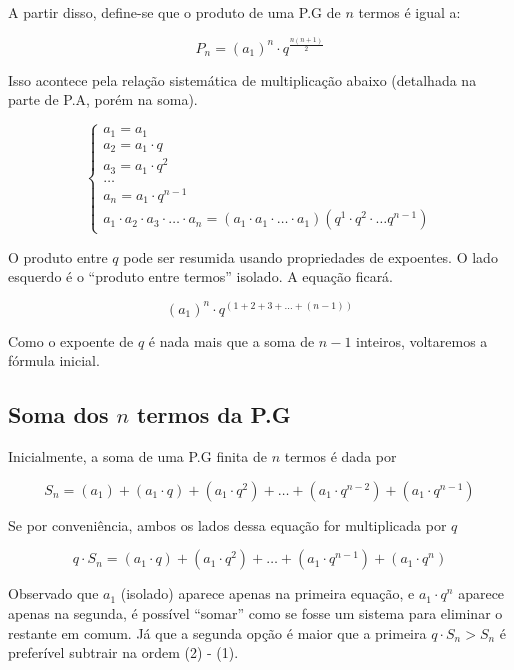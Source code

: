 A partir disso, define-se que o produto de uma P.G de $n$ termos é igual a:

\begin{tcolorbox}[colback=LightYellow]
\[P_{n} = (a_{1})^{n} \cdot q^{\frac{n(n + 1)}{2}}\]
\end{tcolorbox}

Isso acontece pela relação sistemática de multiplicação abaixo (detalhada na parte de P.A, porém na soma).

\begin{tcolorbox}[colback=LightYellow]
\begin{equation*}
\begin{cases}
  a_{1} = a_{1} \\
  a_{2} = a_{1}\cdot q \\
  a_{3} = a_{1}\cdot q^{2} \\
  \dots \\
  a_{n} = a_{1} \cdot q^{n - 1} \\
  \hline
  a_{1}\cdot a_{2}\cdot a_{3}\cdot \dots \cdot a_{n} = (a_{1}\cdot a_{1}\cdot \dots \cdot a_{1})(q^{1}\cdot q^{2}\cdot \dots q^{n - 1})
\end{cases}
\end{equation*}
\end{tcolorbox}

O produto entre $q$ pode ser resumida usando propriedades de expoentes. O lado esquerdo é o ``produto entre termos'' isolado. A equação ficará.

\[(a_{1})^{n}\cdot q^{(1 + 2 + 3 + \dots + (n - 1))}\]

Como o expoente de $q$ é nada mais que a soma de $n - 1$ inteiros, voltaremos a fórmula inicial.

\subsection{Soma dos $n$ termos da P.G}

Inicialmente, a soma de uma P.G finita de $n$ termos é dada por

\[S_{n} = (a_{1}) + (a_{1}\cdot q) + (a_{1}\cdot q^{2}) + \dots + (a_{1}\cdot q^{n - 2}) + (a_{1}\cdot q^{n - 1})\]

Se por conveniência, ambos os lados dessa equação for multiplicada por $q$

\[q\cdot S_{n} = (a_{1}\cdot q) + (a_{1}\cdot q^{2}) + \dots + (a_{1}\cdot q^{n - 1}) + (a_{1}\cdot q^{n})\]

Observado que $a_{1}$ (isolado) aparece apenas na primeira equação, e $a_{1}\cdot q^{n}$ aparece apenas na segunda, é possível ``somar'' como se fosse um sistema para eliminar o restante em comum. Já que a segunda opção é maior que a primeira $q\cdot S_{n} > S_{n}$ é preferível subtrair na ordem (2) - (1).


